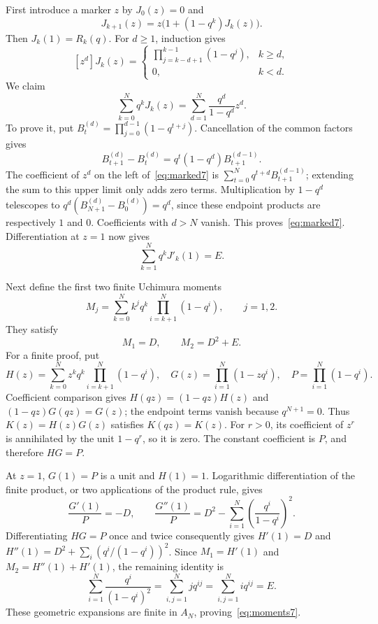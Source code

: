 \documentclass[11pt]{article}
\begin{document}
First introduce a marker $z$ by $J_0(z)=0$ and
\[
J_{k+1}(z)=z\bigl(1+(1-q^k)J_k(z)\bigr).
\]
Then $J_k(1)=R_k(q)$. For $d\ge1$, induction gives
\[
[z^d]J_k(z)=
\begin{cases}
\displaystyle\prod_{j=k-d+1}^{k-1}(1-q^j),&k\ge d,\\
0,&k<d.
\end{cases}
\]
We claim
\begin{equation}\label{eq:marked7}
\sum_{k=0}^{N}q^kJ_k(z)
=\sum_{d=1}^{N}\frac{q^d}{1-q^d}z^d.
\end{equation}
To prove it, put $B_t^{(d)}=\prod_{j=0}^{d-1}(1-q^{t+j})$.
Cancellation of the common factors gives
\[
B_{t+1}^{(d)}-B_t^{(d)}
=q^t(1-q^d)B_{t+1}^{(d-1)}.
\]
The coefficient of $z^d$ on the left of~\eqref{eq:marked7} is
$\sum_{t=0}^{N}q^{t+d}B_{t+1}^{(d-1)}$; extending the sum to this
upper limit only adds zero terms. Multiplication by $1-q^d$ telescopes
to $q^d(B_{N+1}^{(d)}-B_0^{(d)})=q^d$, since these endpoint products
are respectively $1$ and $0$. Coefficients with $d>N$ vanish.
This proves~\eqref{eq:marked7}. Differentiation at $z=1$ now gives
\begin{equation}\label{eq:Jderiv7}
\sum_{k=1}^{N}q^kJ'_k(1)=E.
\end{equation}

Next define the first two finite Uchimura moments
\[
M_j=\sum_{k=0}^{N}k^j q^k\prod_{i=k+1}^{N}(1-q^i),\qquad j=1,2.
\]
They satisfy
\begin{equation}\label{eq:moments7}
M_1=D,\qquad M_2=D^2+E.
\end{equation}
For a finite proof, put
\[
H(z)=\sum_{k=0}^{N}z^kq^k\prod_{i=k+1}^{N}(1-q^i),\quad
G(z)=\prod_{i=1}^{N}(1-zq^i),\quad
P=\prod_{i=1}^{N}(1-q^i).
\]
Coefficient comparison gives
$H(qz)=(1-qz)H(z)$ and $(1-qz)G(qz)=G(z)$; the endpoint terms
vanish because $q^{N+1}=0$. Thus $K(z)=H(z)G(z)$ satisfies
$K(qz)=K(z)$. For $r>0$, its coefficient of $z^r$ is annihilated by
the unit $1-q^r$, so it is zero. The constant coefficient is $P$,
and therefore $HG=P$.

At $z=1$, $G(1)=P$ is a unit and $H(1)=1$. Logarithmic differentiation
of the finite product, or two applications of the product rule, gives
\[
\frac{G'(1)}P=-D,\qquad
\frac{G''(1)}P=D^2-\sum_{i=1}^{N}
 \left(\frac{q^i}{1-q^i}\right)^2.
\]
Differentiating $HG=P$ once and twice consequently gives
$H'(1)=D$ and
$H''(1)=D^2+\sum_i(q^i/(1-q^i))^2$.
Since $M_1=H'(1)$ and $M_2=H''(1)+H'(1)$, the remaining identity is
\[
\sum_{i=1}^{N}\frac{q^i}{(1-q^i)^2}
=\sum_{i,j=1}^{N}j q^{ij}
=\sum_{i,j=1}^{N}i q^{ij}=E.
\]
These geometric expansions are finite in $A_N$, proving~\eqref{eq:moments7}.
\end{document}

